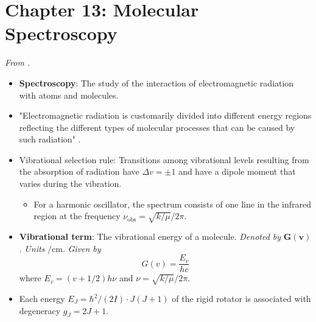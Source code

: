 \documentclass[../notes.tex]{subfiles}
\begin{document}
\section{Chapter 13: Molecular Spectroscopy}
\emph{From \textcite{bib:McQuarrieSimon}.}
\begin{itemize}
    \item {}\textbf{Spectroscopy}: The study of the interaction of electromagnetic radiation with atoms and molecules.
    \item "Electromagnetic radiation is customarily divided into different energy regions reflecting the different types of molecular processes that can be caused by such radiation" \parencite[495-96]{bib:McQuarrieSimon}.
    \item Vibrational selection rule: Transitions among vibrational levels resulting from the absorption of radiation have $\Delta v=\pm 1$ and have a dipole moment that varies during the vibration.
    \begin{itemize}
        \item For a harmonic oscillator, the spectrum consists of one line in the infrared region at the frequency $\nu_\text{obs}=\sqrt{k/\mu}/2\pi$.
    \end{itemize}
    \item \textbf{Vibrational term}: The vibrational energy of a molecule. \emph{Denoted by} $\bm{G(v)}$. \emph{Units} $\si{\per\centi\meter}$. \emph{Given by}
    \begin{equation*}
        G(v) = \frac{E_v}{hc}
    \end{equation*}
    where $E_v=(v+1/2)h\nu$ and $\nu=\sqrt{k/\mu}/2\pi$.
    \item Each energy $E_J=\hbar^2/(2I)\cdot J(J+1)$ of the rigid rotator is associated with degeneracy $g_J=2J+1$.
\end{itemize}
\end{document}
